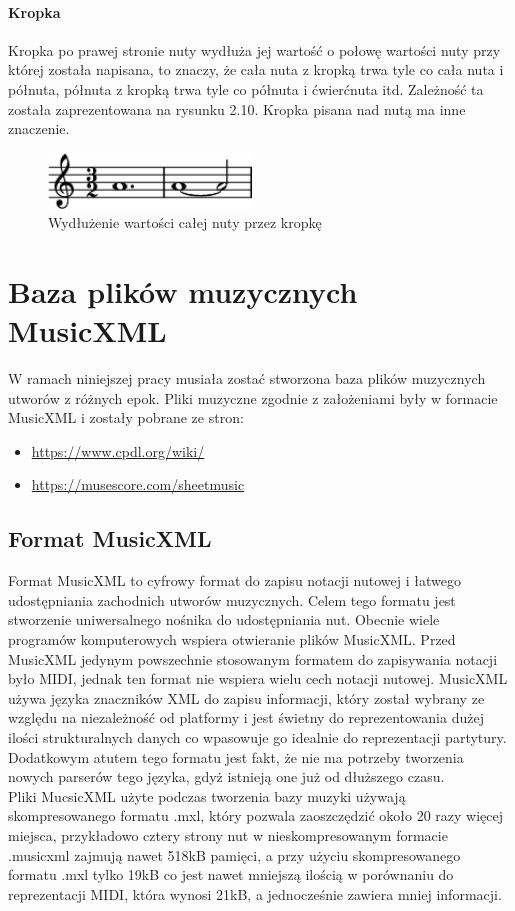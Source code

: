\documentclass[printmode, eng, openany]{mgr}
\newcommand\tab[1][1cm]{\hspace*{#1}}
\begin{document}
\subsubsection{Kropka}
\tab Kropka po prawej stronie nuty wydłuża jej wartość o połowę wartości nuty przy której została napisana, to znaczy, że cała nuta z kropką trwa tyle co cała nuta i półnuta, półnuta z kropką trwa tyle co półnuta i ćwierćnuta itd. Zależność ta została zaprezentowana na rysunku 2.10. Kropka pisana nad nutą ma inne znaczenie.

\begin{figure}[!htb]
\centering
\includegraphics[width=5.4cm]{kropka}
\caption{Wydłużenie wartości całej nuty przez kropkę}
\end{figure}

\chapter{Baza plików muzycznych MusicXML}
\tab W ramach niniejszej pracy musiała zostać stworzona baza plików muzycznych utworów z różnych epok. Pliki muzyczne zgodnie z założeniami były w formacie MusicXML i zostały pobrane ze stron:
\begin{itemize}
\item \url{https://www.cpdl.org/wiki/}
\item \url{https://musescore.com/sheetmusic}
\end{itemize}
\section{Format MusicXML}
\tab Format MusicXML to cyfrowy format do zapisu notacji nutowej i łatwego udostępniania zachodnich utworów muzycznych. Celem tego formatu jest stworzenie uniwersalnego nośnika do udostępniania nut. Obecnie wiele programów komputerowych wspiera otwieranie plików MusicXML. Przed MusicXML jedynym powszechnie stosowanym formatem do zapisywania notacji było MIDI, jednak ten format nie wspiera wielu cech notacji nutowej. MusicXML używa języka znaczników XML do zapisu informacji, który został wybrany ze względu na niezależność od platformy i jest świetny do reprezentowania dużej ilości strukturalnych danych co wpasowuje go idealnie do reprezentacji partytury. Dodatkowym atutem tego formatu jest fakt, że nie ma potrzeby tworzenia nowych parserów tego języka, gdyż istnieją one już od dłuższego czasu.\\
\tab Pliki MucsicXML użyte podczas tworzenia bazy muzyki używają skompresowanego formatu .mxl, który pozwala zaoszczędzić około 20 razy więcej miejsca, przykładowo cztery strony nut w nieskompresowanym formacie .musicxml zajmują nawet 518kB pamięci, a przy użyciu skompresowanego formatu .mxl tylko 19kB co jest nawet mniejszą ilością w porównaniu do reprezentacji MIDI, która wynosi 21kB, a jednocześnie zawiera mniej informacji.
\end{document}
